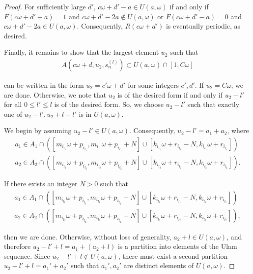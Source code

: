 \documentclass{amsart}
\theoremstyle{theorem}
\theoremstyle{definition}
\begin{document}
\begin{proof}
\noindent For sufficiently large $d'$, $c\omega + d' - a \in U(a,\omega)$ if and only if $F(c\omega + d' - a) = 1$ and $c\omega + d' - 2a \notin U(a,\omega)$ or $F(c\omega + d' - a) = 0$ and $c\omega + d' - 2a \in U(a,\omega)$. Consequently, $R(c\omega + d')$ is eventually periodic, as desired.
	
Finally, it remains to show that the largest element $u_2$ such that
	\begin{align*}
	A\left(c\omega + d, u_2, s_n^{(l)}\right) \subset U(a,\omega) \cap [1,C\omega]
	\end{align*}
			
\noindent can be written in the form $u_2 = c'\omega + d'$ for some integers $c',d'$. If $u_2 = C\omega$, we are done. Otherwise, we note that $u_2$ is of the desired form if and only if $u_2 - l'$ for all $0 \leq l' \leq l$ is of the desired form. So, we choose $u_2 - l'$ such that exactly one of $u_2 - l', u_2 + l - l'$ is in $U(a,\omega)$.
	
We begin by assuming $u_2 - l' \in U(a,\omega)$. Consequently, $u_2 - l' = a_1 + a_2$, where
	\begin{align*}
	a_1 \in A_1 \cap \left([m_{i_{l_1}}\omega + p_{i_{l_1}}, m_{i_{l_1}}\omega + p_{i_{l_1}} + N] \cup [k_{i_{l_1}}\omega + r_{i_{l_1}} - N, k_{i_{l_1}}\omega + r_{i_{l_1}}]\right) \\
	a_2 \in A_2 \cap \left([m_{i_{l_2}}\omega + p_{i_{l_2}}, m_{i_{l_2}}\omega + p_{i_{l_2}} + N] \cup [k_{i_{l_2}}\omega + r_{i_{l_2}} - N, k_{i_{l_2}}\omega + r_{i_{l_2}}]\right).
	\end{align*}
	
\noindent If there exists an integer $N > 0$ such that
	\begin{align*}
	a_1 \in A_1 \cap \left([m_{i_{l_1}}\omega + p_{i_{l_1}}, m_{i_{l_1}}\omega + p_{i_{l_1}} + N] \cup [k_{i_{l_1}}\omega + r_{i_{l_1}} - N, k_{i_{l_1}}\omega + r_{i_{l_1}}]\right) \\
	a_2 \in A_2 \cap \left([m_{i_{l_2}}\omega + p_{i_{l_2}}, m_{i_{l_2}}\omega + p_{i_{l_2}} + N] \cup [k_{i_{l_2}}\omega + r_{i_{l_2}} - N, k_{i_{l_2}}\omega + r_{i_{l_2}}]\right),
	\end{align*}
		
\noindent then we are done. Otherwise, without loss of generality, $a_2 + l \in U(a,\omega)$, and therefore $u_2 - l' + l = a_1 + (a_2 + l)$ is a partition into elements of the Ulam sequence. Since $u_2 - l' + l \notin U(a,\omega)$, there must exist a second partition $u_2 - l' + l = a_1' + a_2'$ such that $a_1', a_2'$ are distinct elements of $U(a,\omega)$.
	

\end{proof}
\end{document}
